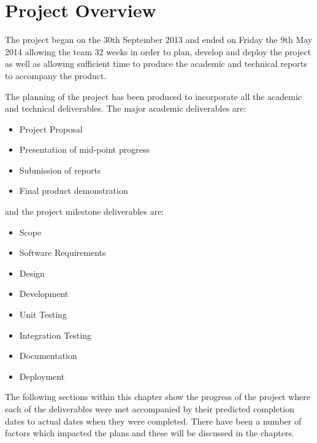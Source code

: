 \section{Project Overview}
\label{sec:project_overview}

The project began on the 30th September 2013 and ended on Friday the 9th May 2014 allowing the team 32 weeks in order to plan, develop and deploy the project as well as allowing sufficient time to produce the academic and technical reports to accompany the product. 

The planning of the project has been produced to incorporate all the academic and technical deliverables. The major academic deliverables are:

\begin{itemize}
 \item Project Proposal
 \item Presentation of mid-point progress
 \item Submission of reports
 \item Final product demonstration
\end{itemize}

and the project milestone deliverables are:

\begin{itemize}
 \item Scope
 \item Software Requirements
 \item Design
 \item Development
 \item Unit Testing
 \item Integration Testing
 \item Documentation
 \item Deployment
\end{itemize}

The following sections within this chapter show the progress of the project where each of the deliverables were met accompanied by their predicted completion dates to actual dates when they were completed. There have been a number of factors which impacted the plans and these will be discussed in the chapters.